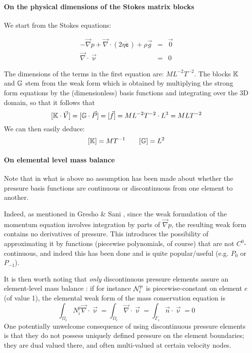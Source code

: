 \paragraph{On the physical dimensions of the Stokes matrix blocks}
We start from the Stokes equations:

\begin{eqnarray}
- {\vec \nabla p} + {\vec \nabla} \cdot (2 \eta \dot{\bm \varepsilon} ) + \rho \vec{g} &=& \vec{0}  \\
\vec \nabla \cdot \vec \upnu &=& 0 
\end{eqnarray}

The dimensions of the terms in the first equation are: $ML^{-2}T^{-2}$. The blocks ${\mathbb{K}}$ and ${\mathbb{G}}$
stem from the weak form which is obtained by multiplying the strong form equations by the (dimensionless)
basis functions and integrating over the 3D domain, so that it follows that 
\[
[ {\mathbb{K}} \cdot \vec V] = [{\mathbb{G}} \cdot \vec P] = [\vec f] = ML^{-2}T^{-2} \cdot  L^3 = MLT^{-2} 
\]
We can then easily deduce:
\[
[{\mathbb{K}}]=MT^{-1}
\quad
\quad
[{\mathbb{G}}]=L^2
\]

\paragraph{On elemental level mass balance}
Note that in what is above no assumption has been made about whether 
the pressure basis functions are continuous or discontinuous from one 
element to another. 

Indeed, as mentioned in Gresho \& Sani \cite{grsa}, since the 
weak formulation of the momentum equation involves
integration by parts of ${\vec \nabla }p$, the resulting weak form contains 
no derivatives of pressure. This introduces the possibility of approximating it
by functions (piecewise polynomials, of course) that are not $C^0$-continuous, 
and indeed this has been done and is quite popular/useful (e.g. $P_0$ or $P_{-1}$). 

It is then worth noting that {\sl only} discontinuous pressure 
elements assure an element-level mass balance \cite{grsa}:
if for instance ${\mathcal{N}}_i^p$ is piecewise-constant on element $e$ (of value 1), the 
elemental weak form of the mass conservation equation is 
\[
\int_{\Omega_e} N_i^p {\vec \nabla} \cdot {\vec \upnu} = 
\int_{\Omega_e} {\vec \nabla} \cdot {\vec \upnu} = 
\int_{\Gamma_e} {\vec n} \cdot {\vec \upnu} = 0
\]
One potentially unwelcome consequence of using 
discontinuous pressure elements is that they 
do not possess uniquely defined pressure 
on the element boundaries; they are dual valued there, 
and often multi-valued at certain velocity nodes. 

